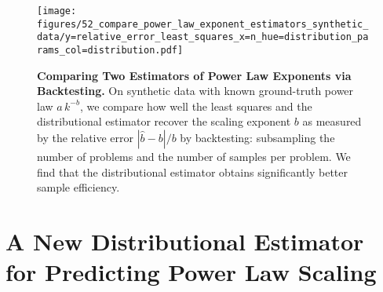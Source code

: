 \begin{figure*}[t!]
    \centering
    \texttt{[image: figures/52\_compare\_power\_law\_exponent\_estimators\_synthetic\_data/y=relative\_error\_least\_squares\_x=n\_hue=distribution\_params\_col=distribution.pdf]}
    \caption{\textbf{Comparing Two Estimators of Power Law Exponents via Backtesting.} On synthetic data with known ground-truth power law $a \, k^{-b}$, we compare how well the least squares and the distributional estimator recover the scaling exponent $b$ as measured by the relative error $|\hat{b} - b| / b$ by backtesting: subsampling the number of problems and the number of samples per problem. We find that the distributional estimator obtains significantly better sample efficiency.}
    \label{fig:backtesting}
\end{figure*}





\section{A New Distributional Estimator for Predicting Power Law Scaling}
\label{sec:estimating_power_law_exponent}

